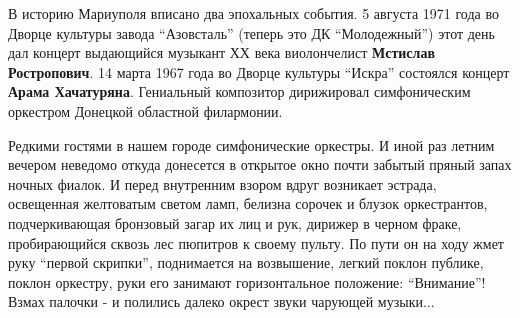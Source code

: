 В историю Мариуполя вписано два эпохальных события. 5 августа 1971 года во
Дворце культуры завода \enquote{Азовсталь} (теперь это ДК \enquote{Молодежный}) этот день дал
концерт выдающийся музыкант ХХ века виолончелист \textbf{Мстислав Ростропович}. 14 марта
1967 года во Дворце культуры \enquote{Искра} состоялся концерт \textbf{Арама Хачатуряна}.
Гениальный композитор дирижировал симфоническим оркестром Донецкой областной
филармонии.

Редкими гостями в нашем городе симфонические оркестры. И иной раз летним
вечером неведомо откуда донесется в открытое окно почти забытый пряный запах
ночных фиалок. И перед внутренним взором вдруг возникает эстрада, освещенная
желтоватым светом ламп, белизна сорочек и блузок оркестрантов, подчеркивающая
бронзовый загар их лиц и рук, дирижер в черном фраке, пробирающийся сквозь лес
пюпитров к своему пульту. По пути он на ходу жмет руку \enquote{первой
скрипки}, поднимается на возвышение, легкий поклон публике, поклон оркестру,
руки его занимают горизонтальное положение: \enquote{Внимание}! Взмах палочки -
и полились далеко окрест звуки чарующей музыки...
